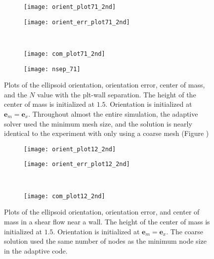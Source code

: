\documentclass{article}
\newcommand{\vect}[1]{\boldsymbol{\mathbf{#1}}}
\begin{document}
\begin{figure}[h!]
  \centering
  \begin{subfigure}{0.49\textwidth}
    \texttt{[image: orient\_plot71\_2nd]}
  \end{subfigure}
  \hfill
  \begin{subfigure}{0.49\textwidth}
    \texttt{[image: orient\_err\_plot71\_2nd]}
  \end{subfigure}
  \\
  \begin{subfigure}{0.49\textwidth}
    \texttt{[image: com\_plot71\_2nd]}
  \end{subfigure}
  \hfill
  \begin{subfigure}{0.49\textwidth}
    \texttt{[image: nsep\_71]}
  \end{subfigure}  
  \caption{Plots of the ellipsoid orientation, orientation error,
    center of mass, and the $N$ value with the plt-wall
    separation. The height of the center of mass is initialized at
    $1.5$. Orientation is initialized at $\vect{e}_m =
    \vect{e}_x$. Throughout almost the entire simulation, the adaptive
  solver used the minimum mesh size, and the solution is nearly
  identical to the experiment with only using a coarse mesh (Figure )}
  \label{fig:plt71}
\end{figure}

\begin{figure}[h!]
  \centering
  \begin{subfigure}{0.49\textwidth}
    \texttt{[image: orient\_plot12\_2nd]}
  \end{subfigure}
  \hfill
  \begin{subfigure}{0.49\textwidth}
    \texttt{[image: orient\_err\_plot12\_2nd]}
  \end{subfigure}
  \\
  \begin{subfigure}{0.49\textwidth}
    \texttt{[image: com\_plot12\_2nd]}
  \end{subfigure}
  \caption{Plots of the ellipsoid orientation, orientation error, and
     center of mass in a shear flow near a wall. The height of the
     center of mass is initialized at $1.5$. Orientation is
     initialized at $\vect{e}_m = \vect{e}_x$. The coarse solution
     used the same number of nodes as the minimum node size in the
     adaptive code.}
  \label{fig:plt12}
\end{figure}



\end{document}
